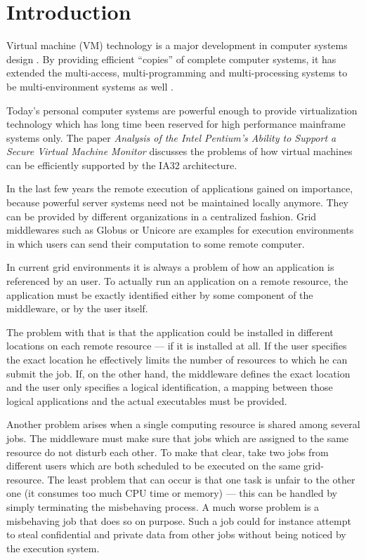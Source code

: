 
\chapter{Introduction}
\label{cha:intro}

Virtual machine (VM) technology is a major development in computer systems
design  \cite{buzen73}.  By  providing  efficient ``copies''  of  complete
computer systems, it has  extended the multi-access, multi-programming and
multi-processing   systems  to  be   multi-environment  systems   as  well
\cite{goldberg73}.

Today's  personal   computer  systems  are  powerful   enough  to  provide
virtualization  technology which  has  long time  been  reserved for  high
performance mainframe systems only.  The paper \emph{Analysis of the Intel
  Pentium's  Ability   to  Support  a  Secure   Virtual  Machine  Monitor}
\cite{robin00analysis} discusses the problems  of how virtual machines can
be efficiently supported by the IA32 architecture.

In  the last  few years  the remote  execution of  applications  gained on
importance, because powerful server systems need not be maintained locally
anymore. They can be provided  by different organizations in a centralized
fashion.  Grid  middle\-wares  such  as Globus  \cite{globus}  or  Unicore
\cite{unicore} are examples for  execution environments in which users can
send their computation to some remote computer.

In current grid environments it is  always a problem of how an application
is referenced  by an  user.  To  actually run an  application on  a remote
resource,  the  application must  be  exactly  identified  either by  some
component of the middleware, or by the user itself.

The  problem with  that  is that  the  application could  be installed  in
different  locations on each  remote resource  --- if  it is  installed at
all. If  the user specifies the  exact location he  effectively limits the
number of resources to which he can submit the job. If, on the other hand,
the middleware  defines the exact location  and the user  only specifies a
logical identification,  a mapping between those  logical applications and
the actual executables must be provided.

Another problem  arises when a  single computing resource is  shared among
several jobs. The  middleware must make sure that  jobs which are assigned
to the same  resource do not disturb each other. To  make that clear, take
two jobs from  different users which are both scheduled  to be executed on
the same grid-resource. The least problem  that can occur is that one task
is unfair to the  other one (\ie it consumes too much  CPU time or memory)
--- this can be handled  by simply terminating the misbehaving process.  A
much worse  problem is a misbehaving job  that does so on  purpose. Such a
job could for instance attempt to steal confidential and private data from
other jobs without being noticed by the execution system.

